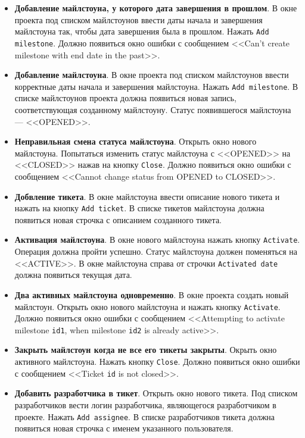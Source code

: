 \begin{itemize}
	\item \textbf{Добавление майлстоуна, у которого дата завершения в прошлом}. В окне проекта под списком майлстоунов ввести даты начала и завершения майлстоуна так, чтобы дата завершения была в прошлом. Нажать \texttt{Add milestone}. Должно появиться окно ошибки с сообщением <<Can't create milestone with end date in the past>>.
	
	\item \textbf{Добавление майлстоуна}. В окне проекта под списком майлстоунов ввести корректные даты начала и завершения майлстоуна. Нажать \texttt{Add milestone}. В списке майлстоунов проекта должна появиться новая запись, соответствующая созданному майлстоуну. Статус появившегося майлстоуна --- <<OPENED>>.
	
	\item \textbf{Неправильная смена статуса майлстоуна}. Открыть окно нового майлстоуна. Попытаться изменить статус майлстоуна с <<OPENED>> на <<CLOSED>> нажав на кнопку \texttt{Close}. Должно появиться окно ошибки с сообщением <<Cannot change status from OPENED to CLOSED>>.
	
	\item \textbf{Добвление тикета}. В окне майлстоуна ввести описание нового тикета и нажать на кнопку \texttt{Add ticket}. В списке тикетов майлстоуна должна появиться новая строчка с описанием созданного тикета.
	
	\item \textbf{Активация майлстоуна}. В окне нового майлстоуна нажать кнопку \texttt{Activate}. Операция должна пройти успешно. Статус майлстоуна должен поменяться на <<ACTIVE>>. В окне майлстоуна справа от строчки \texttt{Activated date} должна появиться текущая дата.
	
	\item \textbf{Два активных майлстоуна одновременно}. В окне проекта создать новый майлстоун. Открыть окно нового майлстоуна и нажать кнопку \texttt{Activate}. Должно появиться окно ошибки с сообщением <<Attempting to activate milestone \texttt{id1}, when milestone \texttt{id2} is already active>>.
	
	\item \textbf{Закрыть майлстоун когда не все его тикеты закрыты}. Окрыть окно активного майлстоуна. Нажать кнопку \texttt{Close}. Должно появиться окно ошибки с сообщением <<Ticket \texttt{id} is not closed>>.
	
	\item \textbf{Добавить разработчика в тикет}. Открыть окно нового тикета. Под списком разработчиков вести логин разработчика, являющегося разработчиком в проекте. Нажать \texttt{Add assignee}. В списке разработчиков тикета должна появиться новая строчка с именем указанного пользователя.
	

\end{itemize}
